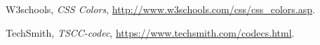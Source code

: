 \begin{thebibliography}{9}
  
 W3schools,
 \emph{CSS Colors},
 \url{http://www.w3schools.com/css/css_colors.asp}.

 TechSmith, \emph{TSCC-codec},
 \url{https://www.techsmith.com/codecs.html}.

\end{thebibliography}